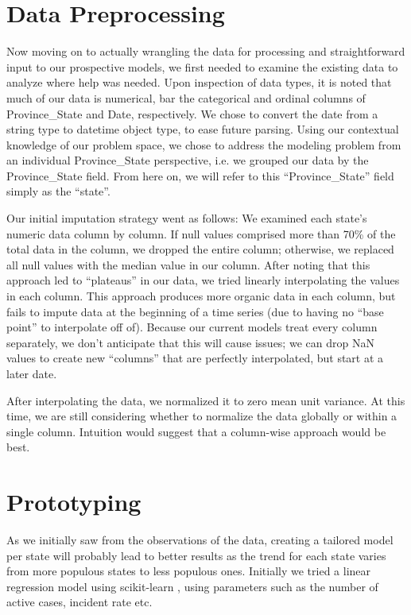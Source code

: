 \documentclass[sigconf]{acmart}
\begin{document}
\section{Data Preprocessing}

Now moving on to actually wrangling the data for processing and straightforward input to our prospective models, we first needed to examine the existing data to analyze where help was needed. Upon inspection of data types, it is noted that much of our data is numerical, bar the categorical and ordinal columns of Province\_State and Date, respectively. We chose to convert the date from a string type to datetime object type, to ease future parsing. Using our contextual knowledge of our problem space, we chose to address the modeling problem from an individual Province\_State perspective, i.e. we grouped our data by the Province\_State field. From here on, we will refer to this “Province\_State” field simply as the “state”. 

Our initial imputation strategy went as follows: 
We examined each state’s numeric data column by column. If null values comprised more than 70\% of the total data in the column, we dropped the entire column; otherwise, we replaced all null values with the median value in our column. 
After noting that this approach led to “plateaus” in our data, we tried linearly interpolating the values in each column. This approach produces more organic data in each column, but fails to impute data at the beginning of a time series (due to having no “base point” to interpolate off of). Because our current models treat every column separately, we don’t anticipate that this will cause issues; we can drop NaN values to create new “columns” that are perfectly interpolated, but start at a later date.  

After interpolating the data, we normalized it to zero mean unit variance. At this time, we are still considering whether to normalize the data globally or within a single column. Intuition would suggest that a column-wise approach would be best.

\section{Prototyping}

As we initially saw from the observations of the data, creating a tailored model per state will probably lead to better results as the trend for each state varies from more populous states to less populous ones. Initially we tried a linear regression model using scikit-learn \cite{scikit-learn}, using parameters such as the number of active cases, incident rate etc. 
\end{document}
